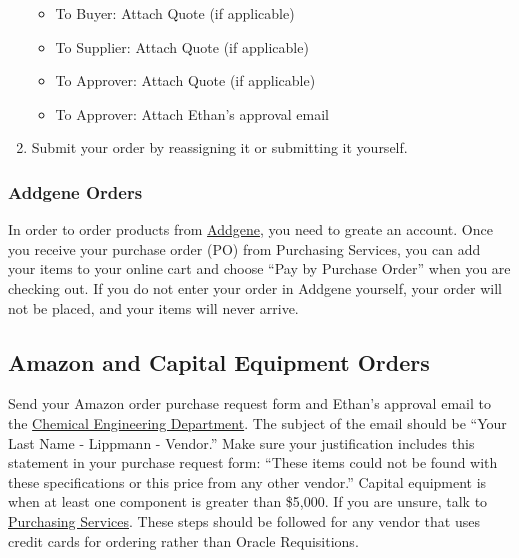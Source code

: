 \documentclass[
]{book}
\begin{document}
\begin{enumerate}
  \begin{itemize}
  \item
    To Buyer: Attach Quote (if applicable)
  \item
    To Supplier: Attach Quote (if applicable)
  \item
    To Approver: Attach Quote (if applicable)
  \item
    To Approver: Attach Ethan's approval email
  \end{itemize}
\item
  Submit your order by reassigning it or submitting it yourself.
\end{enumerate}

\hypertarget{addgene}{%
\subsubsection{Addgene Orders}\label{addgene}}

In order to order products from \href{https://help.addgene.org/hc/en-us/articles/205436319?_ga=2.100504030.1196238464.1608166799-1984471690.1608166799\&_gac=1.53248474.1608166799.CjwKCAiA_eb-BRB2EiwAGBnXXjNbFJq4bB11oAb4wVAgpFjnxn-sVv-PdYz6QgEBRQ9U0g-_hKce1BoCTW0QAvD_BwE}{Addgene}, you need to greate an account. Once you receive your purchase order (PO) from Purchasing Services, you can add your items to your online cart and choose ``Pay by Purchase Order'' when you are checking out. If you do not enter your order in Addgene yourself, your order will not be placed, and your items will never arrive.

\hypertarget{amazon-and-capital-equipment-orders}{%
\subsection{Amazon and Capital Equipment Orders}\label{amazon-and-capital-equipment-orders}}

Send your Amazon order purchase request form and Ethan's approval email to the \href{mailto:chbeorders@vanderbilt.edu}{Chemical Engineering Department}. The subject of the email should be ``Your Last Name - Lippmann - Vendor.'' Make sure your justification includes this statement in your purchase request form: ``These items could not be found with these specifications or this price from any other vendor.'' Capital equipment is when at least one component is greater than \$5,000. If you are unsure, talk to \href{https://finance.vanderbilt.edu/purchasingandpaymentservices/purchasingservices/}{Purchasing Services}. These steps should be followed for any vendor that uses credit cards for ordering rather than Oracle Requisitions.
\end{document}
